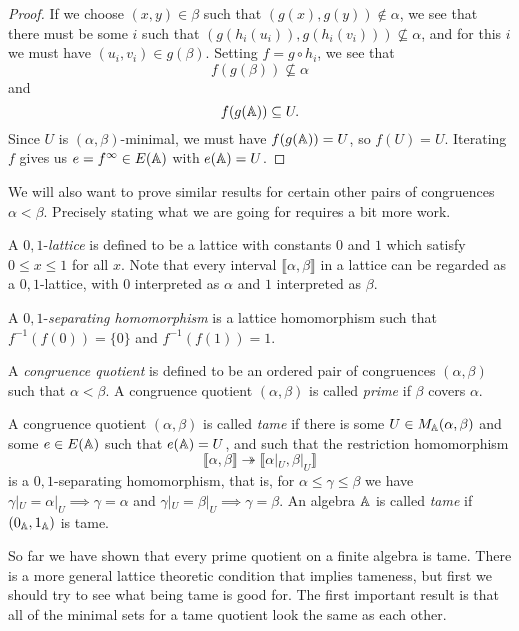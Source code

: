 \begin{appendices}
\begin{proof}
If we choose $(x,y) \in \beta$ such that $(g(x),g(y)) \not\in \alpha$, we see that there must be some $i$ such that $(g(h_i(u_i)), g(h_i(v_i))) \not\subseteq \alpha$, and for this $i$ we must have $(u_i,v_i) \in g(\beta)$. Setting $f = g\circ h_i$, we see that
\[
f(g(\beta)) \not\subseteq \alpha
\]
and
\[
f(g(\mathbb{A})) \subseteq U.
\]
Since $U$ is $(\alpha,\beta)$-minimal, we must have $f(g(\mathbb{A})) = U$, so $f(U) = U$. Iterating $f$ gives us $e = f^{\infty} \in E(\mathbb{A})$ with $e(\mathbb{A}) = U$.
\end{proof}

We will also want to prove similar results for certain other pairs of congruences $\alpha < \beta$. Precisely stating what we are going for requires a bit more work.

\begin{defn} A $0,1$-\emph{lattice} is defined to be a lattice with constants $0$ and $1$ which satisfy $0 \le x \le 1$ for all $x$. Note that every interval $\llbracket \alpha, \beta \rrbracket$ in a lattice can be regarded as a $0,1$-lattice, with $0$ interpreted as $\alpha$ and $1$ interpreted as $\beta$.

A $0,1$-\emph{separating homomorphism} is a lattice homomorphism such that $f^{-1}(f(0)) = \{0\}$ and $f^{-1}(f(1)) = 1$.
\end{defn}

\begin{defn}\label{defn-tame} A \emph{congruence quotient} is defined to be an ordered pair of congruences $(\alpha,\beta)$ such that $\alpha < \beta$. A congruence quotient $(\alpha,\beta)$ is called \emph{prime} if $\beta$ covers $\alpha$.

A congruence quotient $(\alpha,\beta)$ is called \emph{tame} if there is some $U \in M_{\mathbb{A}}(\alpha,\beta)$ and some $e \in E(\mathbb{A})$ such that $e(\mathbb{A}) = U$, and such that the restriction homomorphism
\[
\llbracket \alpha, \beta \rrbracket \twoheadrightarrow \llbracket \alpha|_U, \beta|_U \rrbracket
\]
is a $0,1$-separating homomorphism, that is, for $\alpha \le \gamma \le \beta$ we have $\gamma|_U = \alpha|_U \implies \gamma = \alpha$ and $\gamma|_U = \beta|_U \implies \gamma = \beta$. An algebra $\mathbb{A}$ is called \emph{tame} if $(0_{\mathbb{A}},1_{\mathbb{A}})$ is tame.
\end{defn}

So far we have shown that every prime quotient on a finite algebra is tame. There is a more general lattice theoretic condition that implies tameness, but first we should try to see what being tame is good for. The first important result is that all of the minimal sets for a tame quotient look the same as each other.


\end{appendices}
